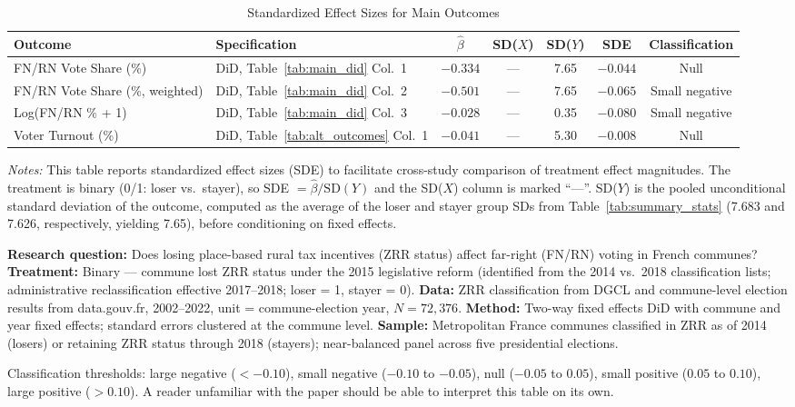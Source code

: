 \documentclass[12pt]{article}
\begin{document}
\begin{table}[H]
\centering
\caption{Standardized Effect Sizes for Main Outcomes}
\label{tab:sde}
\begin{adjustbox}{max width=\textwidth}
\begin{tabular}{llccccc}
\toprule
Outcome & Specification & $\hat{\beta}$ & SD($X$) & SD($Y$) & SDE & Classification \\
\midrule
FN/RN Vote Share (\%) & DiD, Table~\ref{tab:main_did} Col.\ 1 & $-0.334$ & --- & 7.65 & $-0.044$ & Null \\
FN/RN Vote Share (\%, weighted) & DiD, Table~\ref{tab:main_did} Col.\ 2 & $-0.501$ & --- & 7.65 & $-0.065$ & Small negative \\
Log(FN/RN \% + 1) & DiD, Table~\ref{tab:main_did} Col.\ 3 & $-0.028$ & --- & 0.35 & $-0.080$ & Small negative \\
Voter Turnout (\%) & DiD, Table~\ref{tab:alt_outcomes} Col.\ 1 & $-0.041$ & --- & 5.30 & $-0.008$ & Null \\
\bottomrule
\end{tabular}
\end{adjustbox}
\par\vspace{0.3em}
{\footnotesize \emph{Notes:} This table reports standardized effect sizes (SDE)
to facilitate cross-study comparison of treatment effect magnitudes.
The treatment is binary (0/1: loser vs.\ stayer), so SDE $= \hat{\beta} / \text{SD}(Y)$
and the SD($X$) column is marked ``---''.
SD($Y$) is the pooled unconditional standard deviation of the outcome, computed as the average of the loser and stayer group SDs from Table~\ref{tab:summary_stats} (7.683 and 7.626, respectively, yielding 7.65), before conditioning on fixed effects.

\textbf{Research question:} Does losing place-based rural tax incentives (ZRR status) affect far-right (FN/RN) voting in French communes?
\textbf{Treatment:} Binary --- commune lost ZRR status under the 2015 legislative reform (identified from the 2014 vs.\ 2018 classification lists; administrative reclassification effective 2017--2018; loser = 1, stayer = 0).
\textbf{Data:} ZRR classification from DGCL and commune-level election results from data.gouv.fr, 2002--2022, unit = commune-election year, $N = 72{,}376$.
\textbf{Method:} Two-way fixed effects DiD with commune and year fixed effects; standard errors clustered at the commune level.
\textbf{Sample:} Metropolitan France communes classified in ZRR as of 2014 (losers) or retaining ZRR status through 2018 (stayers); near-balanced panel across five presidential elections.

Classification thresholds:
large negative ($< -0.10$), small negative ($-0.10$ to $-0.05$),
null ($-0.05$ to $0.05$), small positive ($0.05$ to $0.10$),
large positive ($> 0.10$).
A reader unfamiliar with the paper should be able to interpret this table on its own.}
\end{table}
\end{document}
